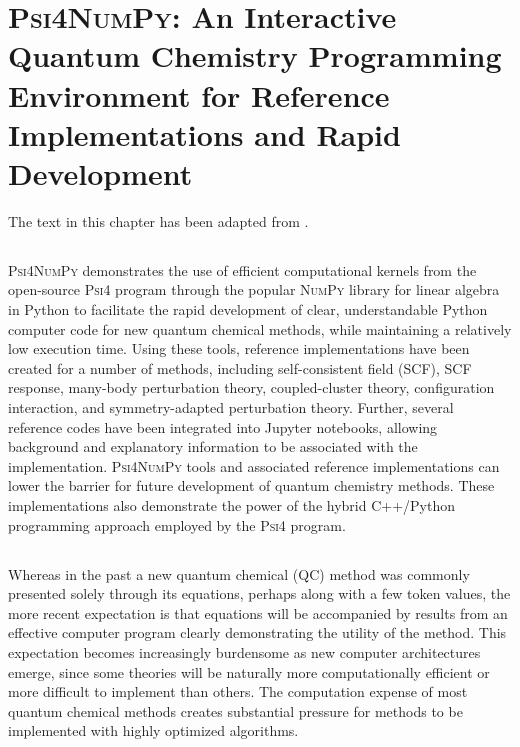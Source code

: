 \newcommand{\numpy}{\textsc{NumPy}\xspace}
\newcommand{\pfour}{\textsc{Psi4}\xspace}
\newcommand{\pfn}{\textsc{Psi4NumPy}\xspace}

\chapter[\pfn]{\pfn: An Interactive Quantum Chemistry Programming Environment for Reference Implementations and Rapid Development}
\label{ch:paper_05}

The text in this chapter has been adapted from .

\section{\texorpdfstring{}{Summary}}

\pfn demonstrates the use of efficient computational kernels from the open-source \pfour program through the popular \numpy library for linear algebra in Python to facilitate the rapid development of clear, understandable Python computer code for new quantum chemical methods, while maintaining a relatively low execution time.  Using these tools, reference implementations have been created for a number of methods, including self-consistent field (SCF), SCF response, many-body perturbation theory, coupled-cluster theory, configuration interaction, and symmetry-adapted perturbation theory.  Further, several reference codes have been integrated into Jupyter notebooks, allowing background and explanatory information to be associated with the implementation.  \pfn tools and associated reference implementations can lower the barrier for future development of quantum chemistry methods.  These implementations also demonstrate the power of the hybrid C++/Python programming approach employed by the \pfour program.

\section{\texorpdfstring{}{Introduction}}

Whereas in the past a new quantum chemical (QC) method was commonly presented solely through its equations, perhaps along with a few token values, the more recent expectation is that equations will be accompanied by results from an effective computer program clearly demonstrating the utility of the method.  This expectation becomes increasingly burdensome as new computer architectures emerge, since some theories will be naturally more computationally efficient or more difficult to implement than others.  The computation expense of most quantum chemical methods creates substantial pressure for methods to be implemented with highly optimized algorithms.

